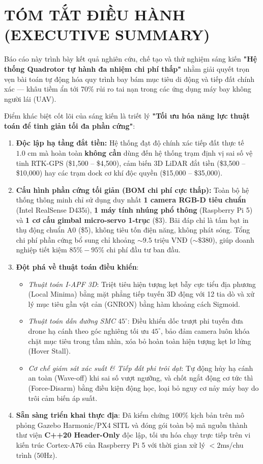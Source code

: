 \documentclass[12pt,a4paper]{article}
\begin{document}
\section*{TÓM TẮT ĐIỀU HÀNH (EXECUTIVE SUMMARY)}

Báo cáo này trình bày kết quả nghiên cứu, chế tạo và thử nghiệm sáng kiến \textbf{"Hệ thống Quadrotor tự hành đa nhiệm chi phí thấp"} nhằm giải quyết trọn vẹn bài toán tự động hóa quy trình bay bám mục tiêu di động và tiếp đất chính xác — khâu tiềm ẩn tới 70\% rủi ro tai nạn trong các ứng dụng máy bay không người lái (UAV).

Điểm khác biệt cốt lõi của sáng kiến là triết lý \textbf{"Tối ưu hóa năng lực thuật toán để tinh giản tối đa phần cứng"}:
\begin{enumerate}[noitemsep,topsep=3pt]
    \item \textbf{Độc lập hạ tầng đắt tiền:} Hệ thống đạt độ chính xác tiếp đất thực tế \textbf{$1.0\text{ cm}$} mà hoàn toàn \textbf{không cần} dùng đến hệ thống trạm định vị sai số vệ tinh RTK-GPS (\$1,500 -- \$4,500), cảm biến 3D LiDAR đắt tiền (\$3,500 -- \$10,000) hay các trạm dock cơ khí độc quyền (\$15,000 -- \$35,000).
    \item \textbf{Cấu hình phần cứng tối giản (BOM chi phí cực thấp):} Toàn bộ hệ thống thông minh chỉ sử dụng duy nhất \textbf{1 camera RGB-D tiêu chuẩn} (Intel RealSense D435i), \textbf{1 máy tính nhúng phổ thông} (Raspberry Pi 5) và \textbf{1 cơ cấu gimbal micro-servo 1-trục} (\$3). Bãi đáp chỉ là tấm bạt in thụ động chuẩn A0 (\$5), không tiêu tốn điện năng, không phát sóng. Tổng chi phí phần cứng bổ sung chỉ khoảng \textbf{$\sim 9.5\text{ triệu VNĐ}$} ($\sim \$380$), giúp doanh nghiệp tiết kiệm \textbf{$85\% - 95\%$} chi phí đầu tư ban đầu.
    \item \textbf{Đột phá về thuật toán điều khiển}:
    \begin{itemize}[noitemsep]
        \item \textit{Thuật toán I-APF 3D}: Triệt tiêu hiện tượng kẹt bẫy cực tiểu địa phương (Local Minima) bằng mặt phẳng tiếp tuyến 3D động với 12 tia dò và xử lý mục tiêu gần vật cản (GNRON) bằng hàm khoảng cách Sigmoid.
        \item \textit{Thuật toán dẫn đường SMC $45^\circ$}: Điều khiển dốc trượt phi tuyến đưa drone hạ cánh theo góc nghiêng tối ưu $45^\circ$, bảo đảm camera luôn khóa chặt mục tiêu trong tầm nhìn, xóa bỏ hoàn toàn hiện tượng kẹt lơ lửng (Hover Stall).
        \item \textit{Cơ chế giám sát xác suất \& Tiếp đất phi trôi dạt}: Tự động hủy hạ cánh an toàn (Wave-off) khi sai số vượt ngưỡng, và chốt ngắt động cơ tức thì (Force-Disarm) bằng điều kiện động học, loại bỏ nguy cơ nảy máy bay do trôi cảm biến áp suất.
    \end{itemize}
    \item \textbf{Sẵn sàng triển khai thực địa}: Đã kiểm chứng $100\%$ kịch bản trên mô phỏng Gazebo Harmonic/PX4 SITL và đóng gói toàn bộ mã nguồn thành thư viện \textbf{C++20 Header-Only} độc lập, tối ưu hóa chạy trực tiếp trên vi kiến trúc Cortex-A76 của Raspberry Pi 5 với thời gian xử lý $< 2\text{ms}$/chu trình ($50\text{Hz}$).
\end{enumerate}
\end{document}
